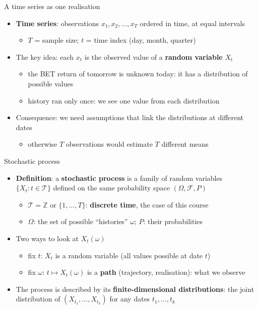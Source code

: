 \begin{frame}{A time series as one realisation}
\itemsize{\small}
\begin{itemize}
    \item \textbf{Time series}: observations $x_1, x_2, \dots, x_T$ ordered in time, at equal intervals
    \begin{itemize}
        \item $T$ = sample size; $t$ = time index (day, month, quarter)
    \end{itemize}
    \item The key idea: each $x_t$ is the observed value of a \textbf{random variable} $X_t$
    \begin{itemize}
        \item the BET return of tomorrow is unknown today: it has a distribution of possible values
        \item history ran only once: we see one value from each distribution
    \end{itemize}
    \item Consequence: we need assumptions that link the distributions at different dates
    \begin{itemize}
        \item otherwise $T$ observations would estimate $T$ different means
    \end{itemize}
\end{itemize}
\end{frame}

\begin{frame}{Stochastic process}
\itemsize{\small}
\begin{itemize}
    \item \textbf{Definition}: a \textbf{stochastic process} is a family of random variables $\{X_t : t \in \mathcal{T}\}$ defined on the same probability space $(\Omega, \mathcal{F}, P)$
    \begin{itemize}
        \item $\mathcal{T} = \mathbb{Z}$ or $\{1, \dots, T\}$: \textbf{discrete time}, the case of this course
        \item $\Omega$: the set of possible ``histories'' $\omega$; $P$: their probabilities
    \end{itemize}
    \item Two ways to look at $X_t(\omega)$
    \begin{itemize}
        \item fix $t$: $X_t$ is a random variable (all values possible at date $t$)
        \item fix $\omega$: $t \mapsto X_t(\omega)$ is a \textbf{path} (trajectory, realisation): what we observe
    \end{itemize}
    \item The process is described by its \textbf{finite-dimensional distributions}: the joint distribution of $(X_{t_1}, \dots, X_{t_k})$ for any dates $t_1, \dots, t_k$
\end{itemize}
\end{frame}

